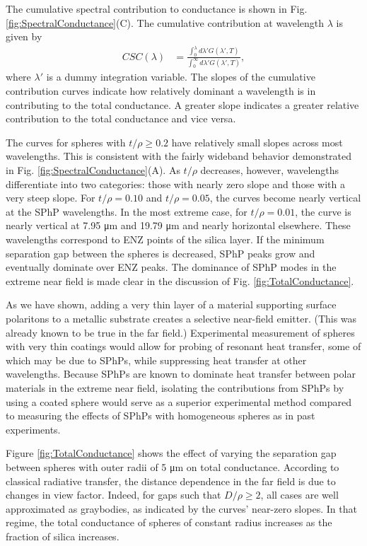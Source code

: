 The cumulative spectral contribution to conductance is shown in Fig. \ref{fig:SpectralConductance}(C). The cumulative contribution at wavelength $\lambda$ is given by 
%
\begin{align}
CSC(\lambda) &= \frac{\int_{0}^{\lambda} d\lambda' G(\lambda',T)}{\int_{0}^{\infty} d\lambda' G(\lambda',T)},
\end{align}
%
where $\lambda'$ is a dummy integration variable. The slopes of the cumulative contribution curves indicate how relatively dominant a wavelength is in contributing to the total conductance. A greater slope indicates a greater relative contribution to the total conductance and vice versa.

The curves for spheres with $t/\rho \ge 0.2$ have relatively small slopes across most wavelengths. This is consistent with the fairly wideband behavior demonstrated in Fig. \ref{fig:SpectralConductance}(A). As $t/\rho$ decreases, however, wavelengths differentiate into two categories: those with nearly zero slope and those with a very steep slope. For $t/\rho =0.10$ and $t/\rho =0.05$, the curves become nearly vertical at the SPhP wavelengths. In the most extreme case, for $t/\rho=0.01$, the curve is nearly vertical at 7.95 \si{\micro\meter} and 19.79 \si{\micro\meter} and nearly horizontal elsewhere. These wavelengths correspond to ENZ points of the silica layer.  If the minimum separation gap between the spheres is decreased, SPhP peaks grow and eventually dominate over ENZ peaks. The dominance of SPhP modes in the extreme near field is made clear in the discussion of Fig. \ref{fig:TotalConductance}.

As we have shown, adding a very thin layer of a material supporting surface polaritons to a metallic substrate creates a selective near-field emitter. (This was already known to be true in the far field.\cite{Granqvist1980, Narayanaswamy2014}) Experimental measurement of spheres with very thin coatings would allow for probing of resonant heat transfer, some of which may be due to SPhPs, while suppressing heat transfer at other wavelengths. Because SPhPs are known to dominate heat transfer between polar materials in the extreme near field, isolating the contributions from SPhPs by using a coated sphere would serve as a superior experimental method compared to measuring the effects of SPhPs with homogeneous spheres as in past experiments.\cite{Narayanaswamy2008a, Shen2009, Guha2012}

Figure \ref{fig:TotalConductance} shows the effect of varying the separation gap between spheres with outer radii of 5 \si{\micro\meter} on total conductance. According to classical radiative transfer, the distance dependence in the far field is due to changes in view factor. Indeed, for gaps such that $D/\rho \ge 2$, all cases are well approximated as graybodies, as indicated by the curves' near-zero slopes. In that regime, the total conductance of spheres of constant radius increases as the fraction of silica increases.

